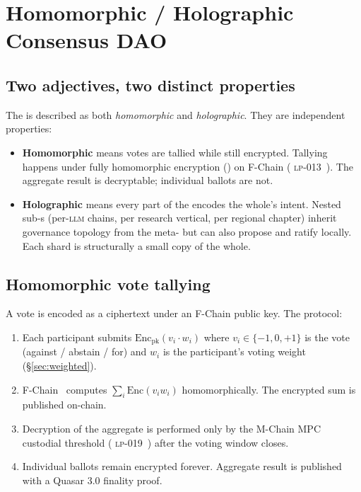\section{Homomorphic / Holographic Consensus DAO}
\label{sec:dao}

\subsection{Two adjectives, two distinct properties}

The \Zoo{} \DAO{} is described as both \emph{homomorphic} and
\emph{holographic}. They are independent properties:

\begin{itemize}[nosep,leftmargin=1.2em]
\item \textbf{Homomorphic} means votes are tallied while still encrypted.
  Tallying happens under fully homomorphic encryption (\FHE{})
  on \Lux{} F-Chain (\Lux{} \textsc{lp-013}~\cite{lp-013-fchain}).
  The aggregate result is decryptable; individual ballots are not.
\item \textbf{Holographic} means every part of the \DAO{} encodes the
  whole's intent. Nested sub-\DAO{}s (per-\textsc{llm} chains, per
  research vertical, per regional chapter) inherit governance
  topology from the meta-\DAO{} but can also propose and ratify
  locally. Each shard is structurally a small copy of the whole.
\end{itemize}

\subsection{Homomorphic vote tallying}

A vote is encoded as a ciphertext under an F-Chain
\FHE{} public key. The protocol:

\begin{enumerate}[nosep,leftmargin=1.4em]
\item Each participant submits $\mathrm{Enc}_{\text{pk}}(v_i \cdot w_i)$
  where $v_i \in \{-1, 0, +1\}$ is the vote (against / abstain / for)
  and $w_i$ is the participant's voting weight (\S\ref{sec:weighted}).
\item F-Chain~\cite{lp-013-fchain} computes $\sum_i \mathrm{Enc}(v_i w_i)$
  homomorphically. The encrypted sum is published on-chain.
\item Decryption of the aggregate is performed only by the
  M-Chain MPC custodial threshold (\Lux{} \textsc{lp-019}~\cite{lp-019-mchain})
  after the voting window closes.
\item Individual ballots remain encrypted forever. Aggregate result
  is published with a Quasar 3.0 finality proof.
\end{enumerate}

